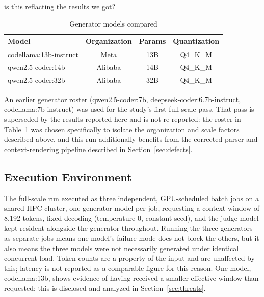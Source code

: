 is this reflacting the results we got?\documentclass[conference]{IEEEtran}
\begin{document}
\begin{table}[htbp]
\caption{Generator models compared}
\label{tab:models}
\centering
\begin{tabular}{@{}lccc@{}}
\toprule
Model & Organization & Params & Quantization \\
\midrule
codellama:13b-instruct & Meta & 13B & Q4\_K\_M \\
qwen2.5-coder:14b & Alibaba & 14B & Q4\_K\_M \\
qwen2.5-coder:32b & Alibaba & 32B & Q4\_K\_M \\
\bottomrule
\end{tabular}
\end{table}

An earlier generator roster (qwen2.5-coder:7b, deepseek-coder:6.7b-instruct,
codellama:7b-instruct) was used for the study's first full-scale pass. That pass is superseded
by the results reported here and is not re-reported: the roster in Table~\ref{tab:models} was
chosen specifically to isolate the organization and scale factors described above, and this run
additionally benefits from the corrected parser and context-rendering pipeline described in
Section~\ref{sec:defects}.

\subsection{Execution Environment}
\label{sec:setup-exec}
The full-scale run executed as three independent, GPU-scheduled batch jobs on a shared HPC
cluster, one generator model per job, requesting a context window of 8{,}192 tokens, fixed
decoding (temperature 0, constant seed), and the judge model kept resident alongside the
generator throughout. Running the three generators as separate jobs means one model's failure
mode does not block the others, but it also means the three models were not necessarily
generated under identical concurrent load. Token counts are a property of the input and are
unaffected by this; latency is not reported as a comparable figure for this reason. One model,
codellama:13b, shows evidence of having received a smaller effective window than requested; this
is disclosed and analyzed in Section~\ref{sec:threats}.
\end{document}
